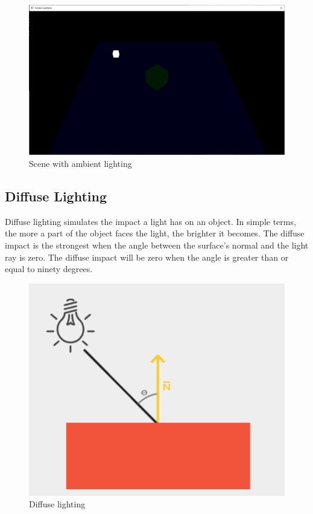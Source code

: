 \begin{figure}[H]
    \centering
    \includegraphics[scale=0.25]{images/ChBlinnPhong/SceneAmbient.png}
    \caption{Scene with ambient lighting}
    \label{fig::SceneAmbient}
\end{figure}

\subsection{Diffuse Lighting}

Diffuse lighting simulates the impact a light has on an object.
In simple terms, the more a part of the object faces the light, the brighter
it becomes.
The diffuse impact is the strongest when
the angle between the surface's normal and the light ray is zero.
The diffuse impact will be zero when the angle is greater than or equal to
ninety degrees.

\begin{figure}[H]
    \centering
    \includegraphics[scale=0.40]{images/ChBlinnPhong/DiffuseLighting.png}
    \caption{Diffuse lighting}
    \label{fig::DiffuseLighting}
\end{figure}

